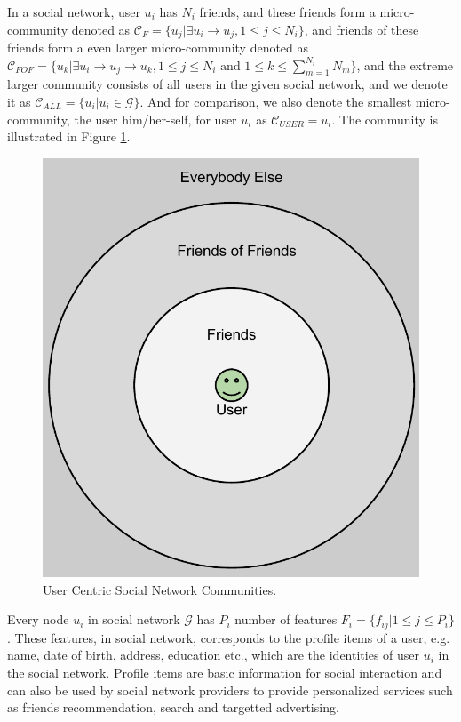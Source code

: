 \documentclass[a4paper]{article}
\begin{document}
In a social network, user $u_i$ has $N_i$ friends, and these friends
form a micro-community denoted as $\mathcal{C}_F=\{u_j|\exists u_i\rightarrow
u_j, 1\leq j\leq N_i\}$, and friends of these friends form a even larger
micro-community denoted as $\mathcal{C}_{FOF} = \{u_k|\exists u_i\rightarrow
u_j\rightarrow u_k, 1\leq j\leq N_i \mbox{ and } 1\leq k \leq
\sum_{m=1}^{N_i}N_m \}$, and the extreme larger community consists of
all users in the given social network, and we denote it as $\mathcal{C}_{ALL} =
\{ u_i|u_i\in\mathcal{G} \}$. And for comparison, we also denote the
smallest micro-community, the user him/her-self, for user $u_i$ as
$\mathcal{C}_{USER} = u_i$. The community is illustrated in Figure
\ref{fig:social_circle}.
\begin{figure}[ht]
  \centering
  \includegraphics[width=.5\textwidth]{Privacy_Friendship_Circles.pdf}
  \caption{User Centric Social Network Communities. }
  \label{fig:social_circle}
\end{figure}

Every node $u_i$ in social network $\mathcal{G}$ has $P_i$ number of
features $F_{i}=\{f_{ij}|1\leq j\leq P_i\}$. These
features, in social network, corresponds to the profile items of a
user, e.g. name, date of birth, address, education etc., which are the
identities of user $u_i$ in the social network. Profile items
are basic information for social interaction and can also be used by
social network providers to provide personalized
services such as friends recommendation, search and targetted
advertising.
\end{document}

